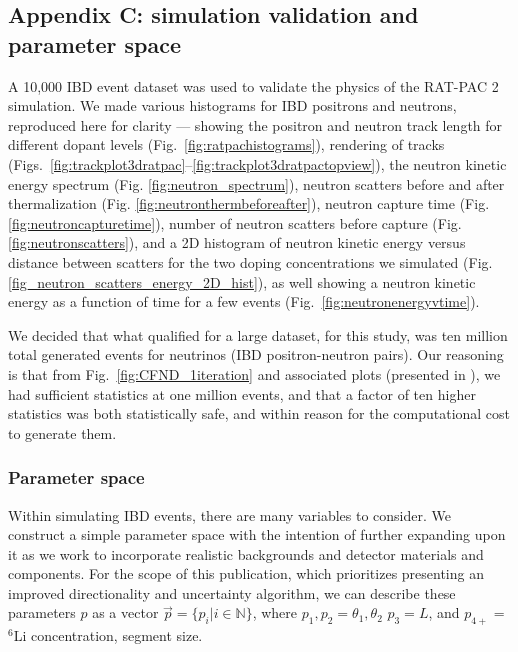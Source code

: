 \documentclass[tightenlines,
twocolumn,prl,notitlepage,nofootinbib,preprintnumbers,longbibliography]{revtex4-1}
\begin{document}
\subsection{Appendix C: simulation validation and parameter space}
\label{app:phys_validation}
A 10,000 IBD event dataset was used to validate the physics of the RAT-PAC 2 simulation. We made various histograms for IBD positrons and neutrons, reproduced here for clarity --- showing the positron and neutron track length for different dopant levels (Fig.~\ref{fig:ratpachistograms}), rendering of tracks (Figs.~\ref{fig:trackplot3dratpac}--\ref{fig:trackplot3dratpactopview}), the neutron kinetic energy spectrum (Fig. \ref{fig:neutron_spectrum}), neutron scatters before and after thermalization (Fig. \ref{fig:neutronthermbeforeafter}), neutron capture time (Fig. \ref{fig:neutroncapturetime}), number of neutron scatters before capture (Fig. \ref{fig:neutronscatters}), and a 2D histogram of neutron kinetic energy versus distance between scatters for the two doping concentrations we simulated (Fig. \ref{fig_neutron_scatters_energy_2D_hist}), as well showing a neutron kinetic energy as a function of time for a few events (Fig.~\ref{fig:neutronenergyvtime}). 

We decided that what qualified for a large dataset, for this study, was ten million total generated events for neutrinos (IBD positron-neutron pairs). Our reasoning is that from Fig.~\ref{fig:CFND_1iteration} and associated plots (presented in \cite{10.1063/5.0315079}), we had sufficient statistics at one million events, and that a factor of ten higher statistics was both statistically safe, and within reason for the computational cost to generate them.


\subsubsection{Parameter space}
%
Within simulating IBD events, there are many variables to consider. We construct a simple parameter space with the intention of further expanding upon it as we work to incorporate realistic backgrounds and detector materials and components. For the scope of this publication, which  prioritizes presenting an improved directionality and uncertainty algorithm, we can describe these parameters $p$ as a vector $\vec{p} = \{p_i|i\in\mathbb{N}\}$, where $p_1,p_2 = \theta_1,\theta_2$ $p_3 = L$, and $p_{4+}$ = $^6$Li concentration, segment size.
\end{document}

